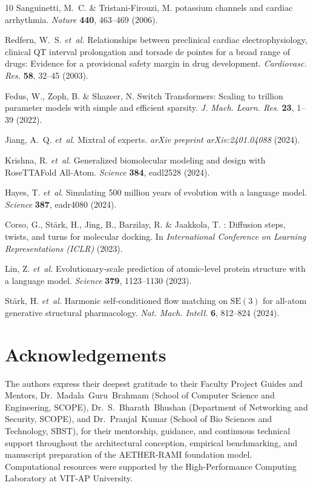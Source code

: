 \documentclass[11pt,a4paper]{article}
\begin{document}
\begin{thebibliography}{10}
Sanguinetti, M.~C. \& Tristani-Firouzi, M.
 potassium channels and cardiac arrhythmia.
\newblock \emph{Nature} \textbf{440}, 463--469 (2006).

Redfern, W.~S. \emph{et~al.}
\newblock Relationships between preclinical cardiac electrophysiology, clinical {QT} interval prolongation and torsade de pointes for a broad range of drugs: Evidence for a provisional safety margin in drug development.
\newblock \emph{Cardiovasc. Res.} \textbf{58}, 32--45 (2003).

Fedus, W., Zoph, B. \& Shazeer, N.
\newblock Switch Transformers: Scaling to trillion parameter models with simple and efficient sparsity.
\newblock \emph{J. Mach. Learn. Res.} \textbf{23}, 1--39 (2022).

Jiang, A.~Q. \emph{et~al.}
\newblock Mixtral of experts.
\newblock \emph{arXiv preprint arXiv:2401.04088} (2024).

Krishna, R. \emph{et~al.}
\newblock Generalized biomolecular modeling and design with {RoseTTAFold All-Atom}.
\newblock \emph{Science} \textbf{384}, eadl2528 (2024).

Hayes, T. \emph{et~al.}
\newblock Simulating 500 million years of evolution with a language model.
\newblock \emph{Science} \textbf{387}, eadr4080 (2024).

Corso, G., St{\"a}rk, H., Jing, B., Barzilay, R. \& Jaakkola, T.
: Diffusion steps, twists, and turns for molecular docking.
\newblock In \emph{International Conference on Learning Representations (ICLR)} (2023).

Lin, Z. \emph{et~al.}
\newblock Evolutionary-scale prediction of atomic-level protein structure with a language model.
\newblock \emph{Science} \textbf{379}, 1123--1130 (2023).

St{\"a}rk, H. \emph{et~al.}
\newblock Harmonic self-conditioned flow matching on {$\mathrm{SE}(3)$} for all-atom generative structural pharmacology.
\newblock \emph{Nat. Mach. Intell.} \textbf{6}, 812--824 (2024).

\end{thebibliography}

\newpage
\section*{Acknowledgements}
The authors express their deepest gratitude to their Faculty Project Guides and Mentors, Dr.~Madala~Guru~Brahmam (School of Computer Science and Engineering, SCOPE), Dr.~S.~Bharath~Bhushan (Department of Networking and Security, SCOPE), and Dr.~Pranjal~Kumar (School of Bio Sciences and Technology, SBST), for their mentorship, guidance, and continuous technical support throughout the architectural conception, empirical benchmarking, and manuscript preparation of the AETHER-RAMI foundation model. Computational resources were supported by the High-Performance Computing Laboratory at VIT-AP University.
\end{document}

